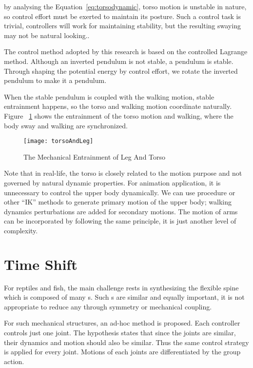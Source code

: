 by analysing the Equation~\ref{eq:torsodynamic},  torso motion is unstable in nature,  so control effort must be exerted to maintain its posture.
Such a control task is trivial,  \pd controllers will work for maintaining stability, but the resulting swaying may not be natural looking..

The control method adopted by this research is based on the controlled Lagrange method.
Although an inverted pendulum is not stable, a pendulum is stable.
Through shaping the potential energy by control effort, we  rotate the inverted pendulum to make it a pendulum.

When the stable pendulum is coupled with the walking motion, stable entrainment happens, so the torso and walking motion coordinate naturally. 
Figure ~\ref{fig:torsolegentrainment} shows the entrainment of the torso motion and walking, where the body sway and walking  are synchronized.
\begin{figure}[!htbp]
  \begin{center}
      \texttt{[image: torsoAndLeg]}
    \caption{The Mechanical Entrainment of Leg And Torso}
    \label{fig:torsolegentrainment}
\end{center}
\end{figure}




Note that in real-life, the torso is closely related to the motion purpose and not governed by natural dynamic properties.
For animation application,  it is unnecessary to control the upper body dynamically.
We can use procedure or other ``IK'' methods to generate primary  motion of the upper body;
 walking dynamics perturbations are added for secondary motions.
The motion of arms can be incorporated by following the same principle, it is just another level of complexity.


\section{Time Shift}

For reptiles and fish, the main challenge rests in synthesizing the flexible spine which is composed of many {\dof}s.
Such {\dof}s are similar and equally important, it is not appropriate to reduce any \dof through symmetry or mechanical coupling.

For such mechanical structures, an ad-hoc method is proposed.
Each controller controls just one joint.
The hypothesis states that since the joints are similar, their dynamics and motion should also be similar.
Thus the same control strategy is applied for every joint.
Motions of each joints are differentiated by the group action.


